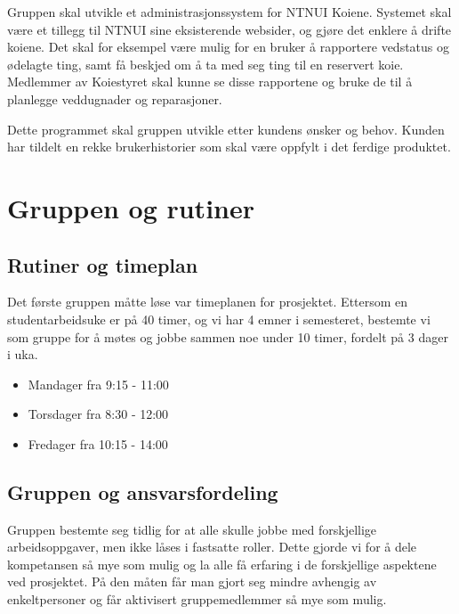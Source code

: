 \documentclass[12pt,a4paper,norsk]{article}
\begin{document}
Gruppen skal utvikle et administrasjonssystem for NTNUI Koiene. Systemet skal være et tillegg til NTNUI sine eksisterende websider, og gjøre det enklere å drifte koiene. Det skal for eksempel være mulig for en bruker å rapportere vedstatus og ødelagte ting, samt få beskjed om å ta med seg ting til en reservert koie. Medlemmer av Koiestyret skal kunne se disse rapportene og bruke de til å planlegge veddugnader og reparasjoner.

Dette programmet skal gruppen utvikle etter kundens ønsker og behov. Kunden har tildelt en rekke brukerhistorier som skal være oppfylt i det ferdige produktet.

\section{Gruppen og rutiner}
	
\subsection{Rutiner og timeplan}

Det første gruppen måtte løse var timeplanen for prosjektet. Ettersom en studentarbeidsuke er på 40 timer, og vi har 4 emner i semesteret, bestemte vi som gruppe for å møtes og jobbe sammen noe under 10 timer, fordelt på 3 dager i uka.

\begin{itemize}
  \item[] Mandager fra 9:15 - 11:00 
  \item[] Torsdager fra 8:30 - 12:00
  \item[] Fredager fra 10:15 - 14:00
\end{itemize}




\subsection{Gruppen og ansvarsfordeling}
Gruppen bestemte seg tidlig for at alle skulle jobbe med forskjellige arbeidsoppgaver, men ikke låses i fastsatte roller. Dette gjorde vi for å dele kompetansen så mye som mulig og la alle få erfaring i de forskjellige aspektene ved prosjektet. På den måten får man gjort seg mindre avhengig av enkeltpersoner og får aktivisert gruppemedlemmer så mye som mulig.
\end{document}
